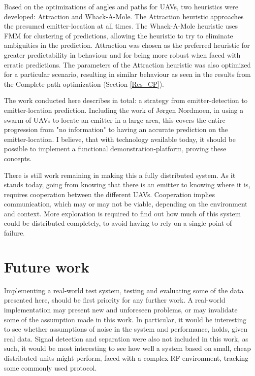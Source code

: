 \documentclass[10pt,a4paper]{book}
\begin{document}

Based on the optimizations of angles and paths for \glspl{UAV}, two heuristics were developed: Attraction and Whack-A-Mole. The Attraction heuristic approaches the presumed emitter-location at all times. The Whack-A-Mole heuristic uses \gls{FMM} for clustering of predictions, allowing the heuristic to try to eliminate ambiguities in the prediction. Attraction was chosen as the preferred heuristic for greater predictability in behaviour and for being more robust when faced with erratic predictions. The parameters of the Attraction heuristic was also optimized for a particular scenario, resulting in similar behaviour as seen in the results from the Complete path optimization (Section \ref{Res_CP}).



The work conducted here describes in total: a strategy from emitter-detection to emitter-location prediction. Including the work of Jørgen Nordmoen, in using a swarm of \glspl{UAV} to locate an emitter in a large area, this covers the entire progression from "no information" to having an accurate prediction on the emitter-location. I believe, that with technology available today, it should be possible to implement a functional demonstration-platform, proving these concepts.


There is still work remaining in making this a fully distributed system. As it stands today, going from knowing that there is an emitter to knowing where it is, requires cooperation between the different \glspl{UAV}. Cooperation implies communication, which may or may not be viable, depending on the environment and context. More exploration is required to find out how much of this system could be distributed completely, to avoid having to rely on a single point of failure.

\newpage
\section{Future work}

Implementing a real-world test system, testing and evaluating some of the data presented here, should be first priority for any further work. A real-world implementation may present new and unforeseen problems, or may invalidate some of the assumption made in this work. In particular, it would be interesting to see whether assumptions of noise in the system and performance, holds, given real data. Signal detection and separation were also not included in this work, as such, it would be most interesting to see how well a system based on small, cheap distributed units might perform, faced with a complex \gls{RF} environment, tracking some commonly used protocol. 
\end{document}

